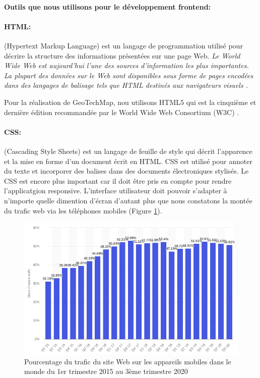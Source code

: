         \paragraph{Outils que nous utilisons pour le développement frontend:}
        \paragraph{HTML: }
        (Hypertext Markup Language) est un langage de programmation utilisé pour décrire 
        la structure des informations présentées sur une page Web. 
        \textit{Le World Wide Web est aujourd'hui l'une des sources d'information les plus 
        importantes. La plupart des données sur le Web sont disponibles sous forme de 
        pages encodées dans des langages de balisage tels que HTML destinés aux 
        navigateurs visuels \cite{yang2003html}.} 
        \par 
        Pour la réalisation de GeoTechMap, nou utilisons HTML5 qui est la cinquième et dernière 
        édition recommandée par le World Wide Web Consortium (W3C) \cite{brooks2010world}.
        \paragraph{CSS: }
         (Cascading Style Sheets) est un langage de feuille de style qui décrit 
        l'apparence et la mise en forme d'un document écrit en HTML. CSS est utilisé 
        pour annoter du texte et incorporer des balises dans des documents électroniques stylisés.
        Le CSS est encore plus important car il doit être pris en compte pour rendre l'applicatgion responsive.
        L'interface utilisateur doit pouvoir s'adapter à n'importe quelle dimention d'écran 
        d'autant plus que nous constatons la montée du trafic web via les téléphones mobiles (Figure \ref{fig:statMobile}).
        \begin{figure}[t]
                \centering
                \includegraphics[scale=0.5]{images/Implementation/statMobile.png}
                \caption{
                        Pourcentage du trafic du site Web sur les appareils 
                        mobiles dans le monde du 1er trimestre 2015 au 3ème trimestre 2020 \cite{linkstatmobile}}
                \label{fig:statMobile}
        \end{figure}

